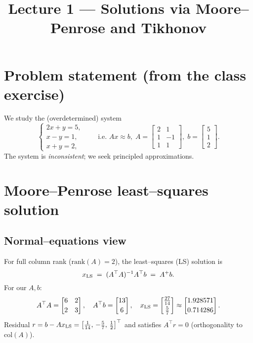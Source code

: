\documentclass[12pt,a4paper]{article}
\title{Lecture 1 — Solutions via Moore–Penrose and Tikhonov}
\date{}
\begin{document}
\maketitle

\section*{Problem statement (from the class exercise)}
We study the (overdetermined) system
\[
\begin{cases}
2x + y = 5,\\
x - y = 1,\\
x + y = 2,
\end{cases}
\qquad
\text{i.e. } A x \approx b,\;
A=\begin{bmatrix}2&1\\[2pt]1&-1\\[2pt]1&1\end{bmatrix},\;
b=\begin{bmatrix}5\\1\\2\end{bmatrix}.
\]
The system is \emph{inconsistent}; we seek principled approximations.

\section{Moore–Penrose least–squares solution}
\subsection*{Normal–equations view}
For full column rank ($\mathrm{rank}(A)=2$), the least–squares (LS) solution is
\[
x_{\rm LS} \;=\; (A^\top A)^{-1}A^\top b \;=\; A^{+} b .
\]
For our $A,b$:
\[
A^\top A = \begin{bmatrix}6&2\\[2pt]2&3\end{bmatrix},\quad
A^\top b = \begin{bmatrix}13\\[2pt]6\end{bmatrix},\quad
x_{\rm LS}=\begin{bmatrix}\tfrac{27}{14}\\[2pt]\tfrac{5}{7}\end{bmatrix}
\approx \begin{bmatrix}1.928571\\[2pt]0.714286\end{bmatrix}.
\]
Residual $r=b-Ax_{\rm LS}=\bigl[\tfrac{1}{14},\, -\tfrac{5}{7},\, \tfrac{1}{2}\bigr]^\top$ and satisfies
$A^\top r=0$ (orthogonality to $\mathrm{col}(A)$).
\end{document}

